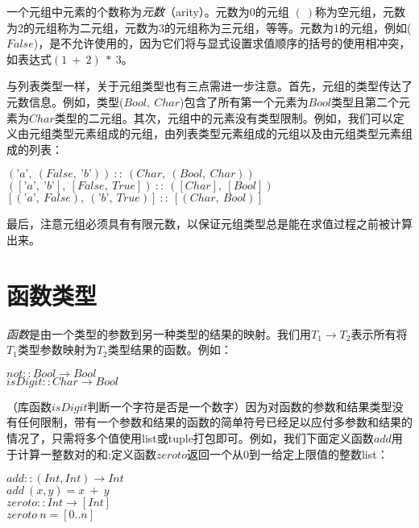 一个元组中元素的个数称为\textit{元数}（arity）。元数为0的元组
$(~)$称为空元组，元数为2的元组称为二元组，元数为3的元组称为三元组，等等。元数为1的元组，例如($False$)，是不允许使用的，因为它们将与显式设置求值顺序的括号的使用相冲突，如表达式$(1~+~2)~*~3$。

与列表类型一样，关于元组类型也有三点需进一步注意。首先，元组的类型传达了元数信息。例如，类型($Bool,
~Char$)包含了所有第一个元素为$Bool$类型且第二个元素为$Char$类型的二元组。其次，元组中的元素没有类型限制。例如，我们可以定义由元组类型元素组成的元组，由列表类型元素组成的元组以及由元组类型元素组成的列表：

\noindent\hspace*{1cm} $(’a’,~(False,~’b’))~::~(Char,~(Bool,~Char))$\\
\hspace*{1cm} $([’a’,~’b’],~[False,~True])~::~([Char],~[Bool])$\\
\hspace*{1cm} $[(’a’,~False),~(’b’,~True)]~::~[(Char,~Bool)]$

最后，注意元组必须具有有限元数，以保证元组类型总是能在求值过程之前被计算出来。

\section{函数类型}
\textit{函数}是由一个类型的参数到另一种类型的结果的映射。我们用$T_1
\rightarrow T_2$表示所有将$T_1$类型参数映射为$T_2$类型结果的函数。例如：

\noindent\hspace*{1cm} $not :: Bool \rightarrow Bool$\\
\hspace*{1cm} $isDigit :: Char \rightarrow Bool$

（库函数$isDigit$判断一个字符是否是一个数字）因为对函数的参数和结果类型没有任何限制，带有一个参数和结果的函数的简单符号已经足以应付多参数和结果的情况了，只需将多个值使用list或tuple打包即可。例如，我们下面定义函数$add$用于计算一整数对的和;定义函数$zeroto$返回一个从$0$到一给定上限值的整数list：

\noindent\hspace*{1cm} $add :: (Int, Int) \rightarrow Int$\\
\hspace*{1cm} $add~(x , y) = x~+~y$\\
\hspace*{1cm} $zeroto :: Int \rightarrow [Int]$\\
\hspace*{1cm} $zeroto~n = [0 . . n ]$

